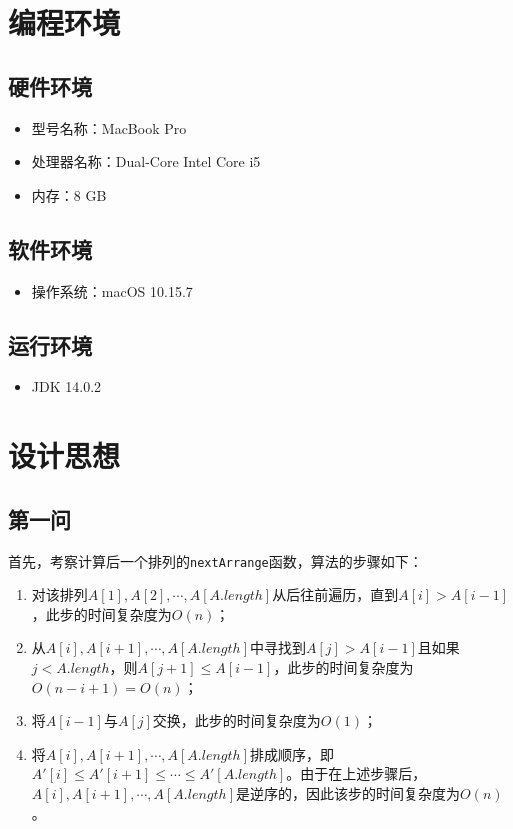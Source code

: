 \documentclass[11pt]{homework}
\begin{document}
\maketitle

\section*{编程环境}

  \subsection*{硬件环境}
  \begin{itemize}
    \item 型号名称：MacBook Pro
    \item 处理器名称：Dual-Core Intel Core i5
    \item 内存：8 GB
  \end{itemize}

  \subsection*{软件环境}
  \begin{itemize}
    \item 操作系统：macOS 10.15.7
  \end{itemize}

  \subsection*{运行环境}
  \begin{itemize}
    \item JDK 14.0.2
  \end{itemize}

\section*{设计思想}

  \subsection*{第一问}
  首先，考察计算后一个排列的\verb|nextArrange|函数，算法的步骤如下：
  \begin{enumerate}
    \item 对该排列$A[1], A[2], \cdots, A[A.length]$从后往前遍历，直到$A[i] > A[i - 1]$，此步的时间复杂度为$O(n)$；
    \item 从$A[i], A[i+1], \cdots, A[A.length]$中寻找到$A[j] > A[i - 1]$且如果$j < A.length$，则$A[j + 1] \leq A[i - 1]$，此步的时间复杂度为$O(n - i + 1) = O(n)$；
    \item 将$A[i - 1]$与$A[j]$交换，此步的时间复杂度为$O(1)$；
    \item 将$A[i], A[i+1], \cdots, A[A.length]$排成顺序，即$A'[i] \leq A'[i+1] \leq \cdots \leq A'[A.length]$。由于在上述步骤后，$A[i], A[i+1], \cdots, A[A.length]$是逆序的，因此该步的时间复杂度为$O(n)$。
  \end{enumerate}
\end{document}
